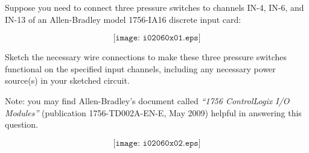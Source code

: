 

Suppose you need to connect three pressure switches to channels IN-4, IN-6, and IN-13 of an Allen-Bradley model 1756-IA16 discrete input card:

$$\texttt{[image: i02060x01.eps]}$$

Sketch the necessary wire connections to make these three pressure switches functional on the specified input channels, including any necessary power source(s) in your sketched circuit.

\vskip 10pt

Note: you may find Allen-Bradley's document called {\it ``1756 ControlLogix I/O Modules''} (publication 1756-TD002A-EN-E, May 2009) helpful in answering this question.







$$\texttt{[image: i02060x02.eps]}$$











